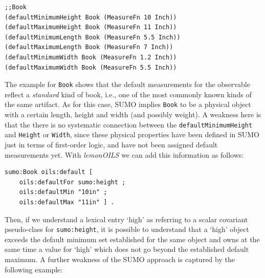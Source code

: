 \documentclass[11pt]{article}
\begin{document}
\begin{small}\begin{verbatim}
;;Book
(defaultMinimumHeight Book (MeasureFn 10 Inch))
(defaultMaximumHeight Book (MeasureFn 11 Inch))
(defaultMinimumLength Book (MeasureFn 5.5 Inch))
(defaultMaximumLength Book (MeasureFn 7 Inch))
(defaultMinimumWidth Book (MeasureFn 1.2 Inch))
(defaultMaximumWidth Book (MeasureFn 5.5 Inch))
\end{verbatim}\end{small}

The example for \texttt{Book} shows that the default measurements for the observable reflect a \textit{standard} kind of book,
i.e., one of the most commonly known kinds of the same artifact. As for this case, SUMO implies \texttt{Book} to be a physical object with a certain length, height and width (and possibly weight). 
A weakness here is that the there is no systematic connection between the {\tt defaultMinimumHeight} and {\tt Height} or {\tt Width}, since these physical properties have been defined in SUMO just in terms of first-order logic, and have not been assigned default measurements yet. With \emph{lemonOILS} we can add this information as follows:

\begin{small}\begin{verbatim}
sumo:Book oils:default [
    oils:defaultFor sumo:height ;
    oils:defaultMin "10in" ;
    oils:defaultMax "11in" ] .
\end{verbatim}\end{small}

Then, if we understand a lexical entry `high' as referring to a scalar covariant pseudo-class for {\tt sumo:height},
it is possible to understand that a `high' object exceeds the default minimum set established for the same object and owns at the same time a value for `high' which does not go beyond the established default maximum. %
A further weakness of the SUMO approach is captured by the following example:
\end{document}
